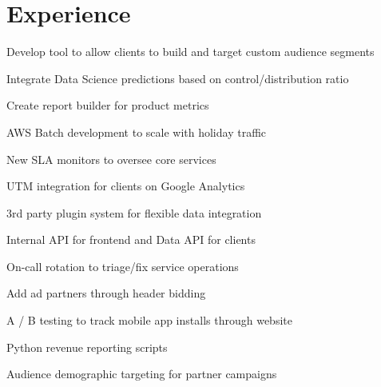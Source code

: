 \documentclass[]{deedy-resume-openfont}
\begin{document}
\begin{minipage}[t]{0.66\textwidth}


\section{Experience}

\vspace{\topsep} %
\begin{tightemize}
\item Develop tool to allow clients to build and target custom audience segments
\item Integrate Data Science predictions based on control/distribution ratio
\item Create report builder for product metrics
\item AWS Batch development to scale with holiday traffic
\item New SLA monitors to oversee core services
\item UTM integration for clients on Google Analytics
\item 3rd party plugin system for flexible data integration
\item Internal API for frontend and Data API for clients
\item On-call rotation to triage/fix service operations
\end{tightemize}
\sectionsep

\begin{tightemize}
\item Add ad partners through header bidding
\item A / B testing to track mobile app installs through website
\item Python revenue reporting scripts
\item Audience demographic targeting for partner campaigns
\end{tightemize}
\sectionsep


\end{minipage}
\end{document}
